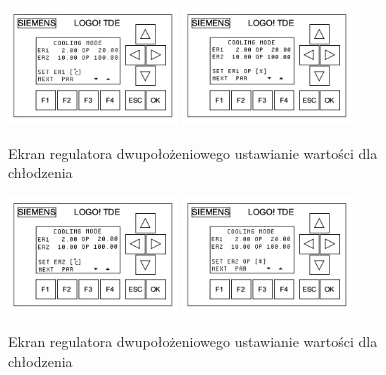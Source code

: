\documentclass[oneside]{mgr}
\begin{document}
\begin{center}
\begin{figure}[h!]
    \centering
    \includegraphics[width=0.40\textwidth]{Ekran60.jpg}
    \includegraphics[width=0.40\textwidth]{Ekran61.jpg}
    \caption{Ekran regulatora dwupołożeniowego ustawianie wartości dla chłodzenia}
    \end{figure}
\end{center}
\begin{center}
\begin{figure}[h!]
    \centering
    \includegraphics[width=0.40\textwidth]{Ekran62.jpg}
    \includegraphics[width=0.40\textwidth]{Ekran63.jpg}
    \caption{Ekran regulatora dwupołożeniowego ustawianie wartości dla chłodzenia}
    \end{figure}
\end{center}
\end{document}
